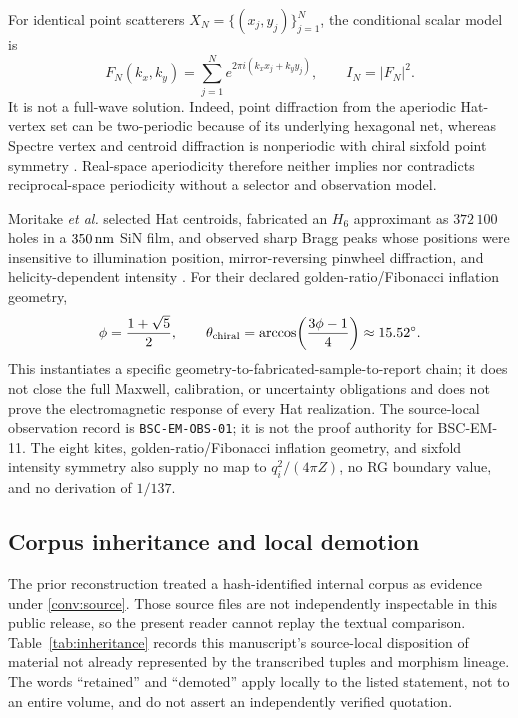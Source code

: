 \documentclass[11pt,a4paper]{article}
\theoremstyle{definition}
\theoremstyle{plain}
\theoremstyle{remark}
\begin{document}
For identical point scatterers \(X_N=\{(x_j,y_j)\}_{j=1}^N\), the conditional
scalar model is
\[
F_N(k_x,k_y)=
\sum_{j=1}^N e^{2\pi i(k_xx_j+k_yy_j)},
\qquad I_N=|F_N|^2.
\]
It is not a full-wave solution.  Indeed, point diffraction from the
aperiodic Hat-vertex set can be two-periodic because of its underlying
hexagonal net, whereas Spectre vertex and centroid diffraction is
nonperiodic with chiral sixfold point symmetry
\citep{kaplan2024hatdiffraction,kaplan2024spectrediffraction}.
Real-space aperiodicity therefore neither implies nor contradicts
reciprocal-space periodicity without a selector and observation model.

Moritake \emph{et al.} selected Hat centroids, fabricated an \(H_6\)
approximant as \(372\,100\) holes in a \(350\,{\rm nm}\) SiN film, and
observed sharp Bragg peaks whose positions were insensitive to illumination
position, mirror-reversing pinwheel diffraction, and helicity-dependent
intensity \citep{moritake2026diffraction}.  For their declared
golden-ratio/Fibonacci inflation geometry,
\[
\phi=\frac{1+\sqrt5}{2},
\qquad
\theta_{\rm chiral}
=\arccos\!\left(\frac{3\phi-1}{4}\right)
\approx15.52^\circ .
\]
This instantiates a specific geometry-to-fabricated-sample-to-report chain; it
does not close the full Maxwell, calibration, or uncertainty obligations and
does not prove the electromagnetic response of every Hat realization.  The
source-local observation record is \texttt{BSC-EM-OBS-01}; it is not the proof
authority for BSC-EM-11.  The eight kites, golden-ratio/Fibonacci inflation
geometry, and sixfold intensity symmetry also supply no map to
\(q_i^2/(4\pi Z)\), no RG boundary value, and no derivation of \(1/137\).

\subsection{Corpus inheritance and local demotion}

The prior reconstruction treated a hash-identified internal corpus as evidence
under \cref{conv:source}.  Those source files are not independently
inspectable in this public release, so the present reader cannot replay the
textual comparison.  Table~\ref{tab:inheritance} records this manuscript's
source-local disposition of material not already represented by the
transcribed tuples and morphism lineage.  The words ``retained'' and
``demoted'' apply locally to the listed statement, not to an entire volume,
and do not assert an independently verified quotation.
\end{document}

